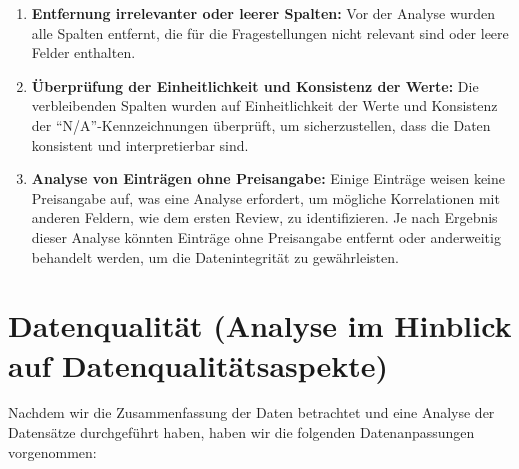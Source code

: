 \documentclass[
  journal,
]{IEEEtran}%
\begin{document}
\begin{enumerate}
\def\labelenumi{\arabic{enumi}.}
\item
  \textbf{Entfernung irrelevanter oder leerer Spalten:} Vor der Analyse
  wurden alle Spalten entfernt, die für die Fragestellungen nicht
  relevant sind oder leere Felder enthalten.
\item
  \textbf{Überprüfung der Einheitlichkeit und Konsistenz der Werte:} Die
  verbleibenden Spalten wurden auf Einheitlichkeit der Werte und
  Konsistenz der ``N/A''-Kennzeichnungen überprüft, um sicherzustellen,
  dass die Daten konsistent und interpretierbar sind.
\item
  \textbf{Analyse von Einträgen ohne Preisangabe:} Einige Einträge
  weisen keine Preisangabe auf, was eine Analyse erfordert, um mögliche
  Korrelationen mit anderen Feldern, wie dem ersten Review, zu
  identifizieren. Je nach Ergebnis dieser Analyse könnten Einträge ohne
  Preisangabe entfernt oder anderweitig behandelt werden, um die
  Datenintegrität zu gewährleisten.
\end{enumerate}

\hypertarget{datenqualituxe4t-analyse-im-hinblick-auf-datenqualituxe4tsaspekte}{%
\section{Datenqualität (Analyse im Hinblick auf
Datenqualitätsaspekte)}\label{datenqualituxe4t-analyse-im-hinblick-auf-datenqualituxe4tsaspekte}}

Nachdem wir die Zusammenfassung der Daten betrachtet und eine Analyse
der Datensätze durchgeführt haben, haben wir die folgenden
Datenanpassungen vorgenommen:
\end{document}
